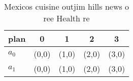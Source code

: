 \documentclass[a4paper]{article}
\begin{document}
\begin{table}
\begin{adjustbox}{width=0.7\columnwidth}
\begin{tabular}{|l|l|l|l|l|}
\hline
\textbf{plan} & \multicolumn{1}{c|}{\textbf{0}} & \multicolumn{1}{c|}{\textbf{1}} & \multicolumn{1}{c|}{\textbf{2}} & \multicolumn{1}{c|}{\textbf{3}} \\ \hline
\textbf{$a_0$}  & (0,0) & (1,0) & (2,0) & (3,0) \\ \hline
\textbf{$a_1$}  & (0,0) & (1,0) & (2,0) & (3,0) \\ \hline
\end{tabular}
\end{adjustbox}
\caption{Mexicos cuisine outjim hills news o ree Health re
}
\end{table}
\end{document}
